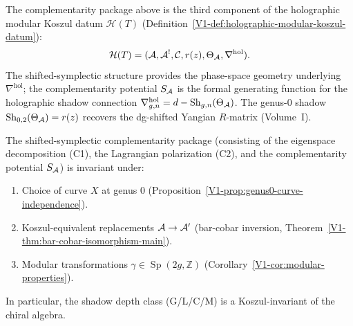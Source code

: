 \begin{remark}
The complementarity package above is the third component of
the holographic modular Koszul datum $\mathcal{H}(T)$
(Definition~\ref{V1-def:holographic-modular-koszul-datum}):
\[
\mathcal{H}(T) = (\mathcal{A}, \mathcal{A}^!, \mathcal{C}, r(z), \Theta_{\mathcal{A}},
\nabla^{\mathrm{hol}}).
\]
The shifted-symplectic structure provides the phase-space
geometry underlying $\nabla^{\mathrm{hol}}$; the
complementarity potential $S_{\mathcal{A}}$ is the formal generating
function for the holographic shadow connection
$\nabla_{g,n}^{\mathrm{hol}} = d - \mathrm{Sh}_{g,n}(\Theta_{\mathcal{A}})$.
The genus-$0$ shadow $\mathrm{Sh}_{0,2}(\Theta_{\mathcal{A}}) = r(z)$ recovers
the dg-shifted Yangian $R$-matrix
(Volume~I).
\end{remark}

\begin{theorem}
The shifted-symplectic complementarity package (consisting
of the eigenspace decomposition \textup{(C1)}, the Lagrangian
polarization \textup{(C2)}, and the complementarity potential
$S_{\mathcal{A}}$) is invariant under:
\begin{enumerate}[label=\textup{(\roman*)}]
\item Choice of curve $X$ at genus $0$
 \textup{(}Proposition~\textup{\ref{V1-prop:genus0-curve-independence})}.
\item Koszul-equivalent replacements $\mathcal{A} \to \mathcal{A}'$
 \textup{(}bar-cobar inversion,
 Theorem~\textup{\ref*{V1-thm:bar-cobar-isomorphism-main})}.
\item Modular transformations $\gamma \in
 \operatorname{Sp}(2g, \mathbb{Z})$
 \textup{(}Corollary~\textup{\ref{V1-cor:modular-properties})}.
\end{enumerate}
In particular, the shadow depth class \textup{(G/L/C/M)} is a
Koszul-invariant of the chiral algebra.
\end{theorem}

